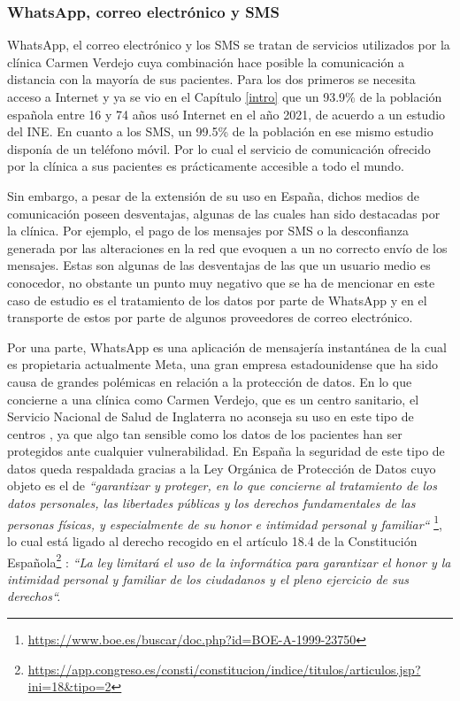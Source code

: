 \subsubsection*{WhatsApp, correo electrónico y SMS}

WhatsApp, el correo electrónico y los SMS se tratan de servicios utilizados por la clínica Carmen Verdejo cuya combinación hace posible la comunicación a distancia con la mayoría de sus pacientes. Para los dos primeros se necesita acceso a Internet y ya se vio en el Capítulo \ref{intro} que un 93.9\% de la población española entre 16 y 74 años usó Internet en el año 2021, de acuerdo a un estudio del INE. En cuanto a los SMS, un 99.5\% de la población en ese mismo estudio disponía de un teléfono móvil. Por lo cual el servicio de comunicación ofrecido por la clínica a sus pacientes es prácticamente accesible a todo el mundo. \bigskip

Sin embargo, a pesar de la extensión de su uso en España, dichos medios de comunicación poseen desventajas, algunas de las cuales han sido destacadas por la clínica. Por ejemplo, el pago de los mensajes por SMS o la desconfianza generada por las alteraciones en la red que evoquen a un no correcto envío de los mensajes. Estas son algunas de las desventajas de las que un usuario medio es conocedor, no obstante un punto muy negativo que se ha de mencionar en este caso de estudio es el tratamiento de los datos por parte de WhatsApp y en el transporte de estos por parte de algunos proveedores de correo electrónico. \bigskip

Por una parte, WhatsApp es una aplicación de mensajería instantánea de la cual es propietaria actualmente Meta, una gran empresa estadounidense que ha sido causa de grandes polémicas en relación a la protección de datos. En lo que concierne a una clínica como Carmen Verdejo, que es un centro sanitario, el Servicio Nacional de Salud de Inglaterra no aconseja su uso en este tipo de centros \cite{Gould2016-ky}, ya que algo tan sensible como los datos de los pacientes han ser protegidos ante cualquier vulnerabilidad. En España la seguridad de este tipo de datos queda respaldada gracias a la Ley Orgánica de Protección de Datos cuyo objeto es el de \textit{``garantizar y proteger, en lo que concierne al tratamiento de los datos personales, las libertades públicas y los derechos fundamentales de las personas físicas, y especialmente de su honor e intimidad personal y familiar``} \footnote{\url{https://www.boe.es/buscar/doc.php?id=BOE-A-1999-23750}}, lo cual está ligado al derecho recogido en el artículo 18.4 de la Constitución Española\footnote{\url{https://app.congreso.es/consti/constitucion/indice/titulos/articulos.jsp?ini=18&tipo=2}} \cite{Editorial_Editorial_ADRIANO2019-kn} : \textit{``La ley limitará el uso de la informática para garantizar el honor y la intimidad personal y familiar de los ciudadanos y el pleno ejercicio de sus derechos``.} \bigskip

